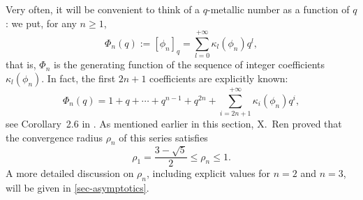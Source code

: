\documentclass[11pt,reqno]{amsart}
\theoremstyle{plain}
\theoremstyle{definition}
\numberwithin{figure}{section}
\numberwithin{table}{section}
\numberwithin{equation}{section}
\newcommand\ka{\kappa}
\let\fr=\frac
\begin{document}
Very often, it will be  convenient to think  of a $q$-metallic number as a function of $q$:  we put, for any $n≥1$,
\begin{equation}\label{Phin-SE0}
\Phi_n(q):=[\phi_n]_q=\sum_{l=0}^{+\infty}\ka_l(\phi_n) q^l,
\end{equation} 
that is, $\Phi_n$ is the generating function of the sequence of integer coefficients $\ka_l(\phi_n)$. In fact, the first $2n+1$ coefficients are explicitly known:
\begin{equation}\label{Phin-SE}
\Phi_n(q)=1+q+\cdots+q^{n-1}+q^{2n}+\sum_{i=2n+1}^{+\infty}\kappa_i(\phi_n) q^i,
\end{equation}
see Corollary~2.6 in \cite{OP25}. As  mentioned earlier in this section, X.~Ren \cite{Ren22} proved that the convergence radius $\rho_n$ of this series satisfies
\begin{equation}\label{rhon}
\rho_1=\fr{3-\sqrt{5}}2≤\rho_n≤1.
\end{equation}
A more detailed discussion on $\rho_n$, including explicit values for $n=2$ and $n=3$, will be given in \cref{sec-asymptotics}.
\end{document}
